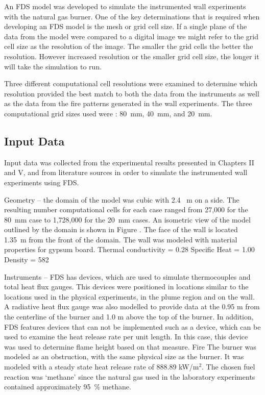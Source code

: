 \documentclass[twoside]{uocthesis}
\begin{document}
An FDS model was developed to simulate the instrumented wall experiments with the natural gas burner.  One of the key determinations that is required when developing an FDS model is the mesh or grid cell size.  If a single plane of the data from the model were compared to a digital image we might refer to the grid cell size as the resolution of the image.  The smaller the grid cells the better the resolution. However increased resolution or the smaller grid cell size, the longer it will take the simulation to run. 

Three different computational cell resolutions were examined to determine which resolution provided the best match to both the data from the instruments as well as the data from the fire patterns generated in the wall experiments.  The three computational grid sizes used were : 80~mm, 40~mm, and 20~mm. 

\subsection{Input Data}

Input data was collected from the experimental results presented in Chapters II and V, and from literature sources in order to simulate the instrumented wall experiments using FDS. 

Geometry – the domain of the model was cubic with 2.4~ m on a side.  The resulting number computational cells for each case ranged from 27,000 for the 80~mm case to 1,728,000 for the 20~mm cases.   An isometric view of the model outlined by the domain is shown in Figure     .  The face of the wall is located 1.35~m from the front of the domain.  
The wall was modeled with material properties for gypsum board.
Thermal conductivity = 0.28
Specific Heat = 1.00
Density = 582

Instruments – FDS has devices, which are used to simulate thermocouples and total heat flux gauges.  This devices were positioned  in locations similar to the locations used in the physical experiments, in the plume region and on the wall.   A radiative heat flux gauge was also modelled to provide data at the 0.95 m from the centerline of the burner and 1.0 m above the top of the burner.  
In addition, FDS features devices that can not be implemented such as a device, which can be used to examine the heat release rate per unit length.  In this case, this device was used to determine flame height based on that measure.     
Fire 
The burner was modeled as an obstruction, with the same physical size as the burner.  It was modeled with a steady state heat release rate of 888.89 kW/m$^2$.   The chosen fuel reaction was `methane' since the natural gas used in the laboratory experiments contained approximately 95~\% methane.  
\end{document}

